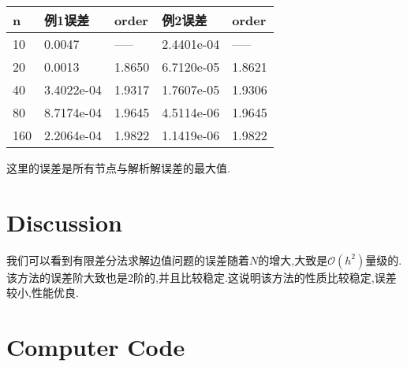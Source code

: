 \documentclass{article}
\begin{document}
	\begin{table}[h]
		\setlength\tabcolsep{25pt}
		\begin{tabular}{|l|l|l|l|l|}
			\hline
			n  &例1误差 & order  & 例2误差 & order  \\ \hline
			10  & 0.0047           & -----  & 2.4401e-04       & -----  \\ \hline
			20 & 0.0013          & 1.8650 & 6.7120e-05       & 1.8621 \\ \hline
			40 & 3.4022e-04       & 1.9317 & 1.7607e-05      & 1.9306 \\ \hline
			80 & 8.7174e-04       & 1.9645 & 4.5114e-06      & 1.9645 \\ \hline
		    160 & 2.2064e-04       & 1.9822 & 1.1419e-06      &1.9822 \\ \hline
		\end{tabular}
	\end{table}

  这里的误差是所有节点与解析解误差的最大值.
	

	
	
	\section{Discussion}
	
	我们可以看到有限差分法求解边值问题的误差随着$N$的增大,大致是$\mathcal{O}(h^2)$量级的.该方法的误差阶大致也是2阶的,并且比较稳定.这说明该方法的性质比较稳定,误差较小,性能优良.
	
	
	\section{Computer Code}
	
	
	
	
\end{document}
